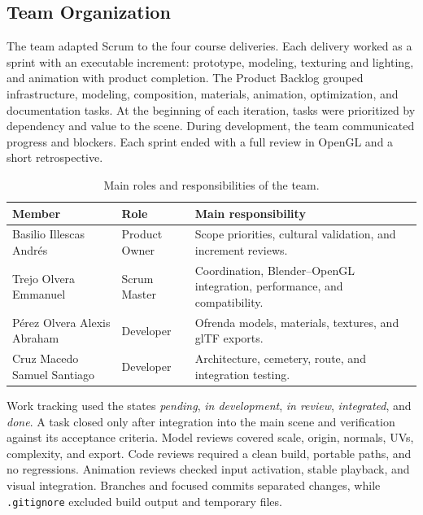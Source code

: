 \documentclass[letter,12pt]{article}
\begin{document}
	\subsection{Team Organization}

	The team adapted Scrum to the four course deliveries. Each delivery worked as
	a sprint with an executable increment: prototype, modeling, texturing and
	lighting, and animation with product completion. The Product Backlog grouped
	infrastructure, modeling, composition, materials, animation, optimization, and
	documentation tasks. At the beginning of each iteration, tasks were prioritized
	by dependency and value to the scene. During development, the team communicated
	progress and blockers. Each sprint ended with a full review in OpenGL and a
	short retrospective.

	\begin{table}[H]
		\centering
		\small
		\begin{tabularx}{0.96\textwidth}{p{3.8cm}p{2.7cm}X}
			\toprule
			\textbf{Member} & \textbf{Role} & \textbf{Main responsibility}\\
			\midrule
			Basilio Illescas Andrés & Product Owner & Scope priorities, cultural validation, and increment reviews.\\
			Trejo Olvera Emmanuel & Scrum Master & Coordination, Blender--OpenGL integration, performance, and compatibility.\\
			Pérez Olvera Alexis Abraham & Developer & Ofrenda models, materials, textures, and glTF exports.\\
			Cruz Macedo Samuel Santiago & Developer & Architecture, cemetery, route, and integration testing.\\
			\bottomrule
		\end{tabularx}
		\caption{Main roles and responsibilities of the team.}
		\label{tab:roles}
	\end{table}

	Work tracking used the states \textit{pending}, \textit{in development},
	\textit{in review}, \textit{integrated}, and \textit{done}. A task closed only
	after integration into the main scene and verification against its acceptance
	criteria. Model reviews covered scale, origin, normals, UVs, complexity, and
	export. Code reviews required a clean build, portable paths, and no regressions.
	Animation reviews checked input activation, stable playback, and visual
	integration. Branches and focused commits separated changes, while
	\texttt{.gitignore} excluded build output and temporary files.
\end{document}
